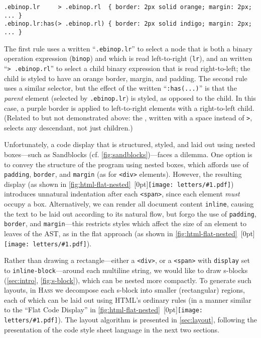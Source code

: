 \documentclass[acmsmall, screen]{acmart}
\newcommand{\hass}
{\textsc{Hass}}
\newcommand{\htmlTag}[1]
  {\texttt{<#1>}}
\newcommand{\cssAttr}[1]
{\texttt{#1}}
\newcommand{\cssClass}[1]
  {\texttt{#1}}
\newcommand{\figBubble}[1]{\raisebox{-0.03in}[0pt]{\texttt{[image: letters/\#1.pdf]}}}
\newcommand{\refBubble}[1]
  {~\figBubble{#1}}
\begin{document}
{\small

\begin{Verbatim}[xleftmargin=\parindent]
.ebinop.lr     > .ebinop.rl  { border: 2px solid orange; margin: 2px; ... }
.ebinop.lr:has(> .ebinop.rl) { border: 2px solid indigo; margin: 2px; ... }
\end{Verbatim}

}

\noindent
The first rule uses a  written ``\cssClass{.ebinop.lr}'' to select a node that is both a binary operation expression (\cssClass{binop}) and which is read left-to-right (\cssClass{lr}), and an  written ``\texttt{> }\cssClass{.ebinop.rl}'' to select a child binary expression that is read right-to-left; the child is styled to have an orange border, margin, and padding.
The second rule uses a similar selector, but the effect of the  written ``\texttt{:has(...)}'' is that the \textit{parent} element (selected by \cssClass{.ebinop.lr}) is styled, as opposed to the child.
In this case, a purple border is applied to left-to-right elements with a right-to-left child.
(Related to but not demonstrated above: the , written with a space instead of \texttt{>}, selects any descendant, not just children.)

Unfortunately, a code display that is structured, styled, and laid out using nested boxes---such as Sandblocks (cf. \autoref{fig:sandblocks})---faces a dilemma.
One option is to convey the structure of the program using nested boxes, which affords use of \cssAttr{padding}, \cssAttr{border}, and \cssAttr{margin} (as for \htmlTag{div} elements).
However, the resulting display (as shown in \autoref{fig:html-flat-nested}\refBubble{b}) introduces unnatural indentation after each \htmlTag{span}, since each element \emph{must} occupy a box.
Alternatively, we can render all document content \cssAttr{inline}, causing the text to be laid out according to its natural flow, but forgo the use of \cssAttr{padding}, \cssAttr{border}, and \cssAttr{margin}---this restricts styles which affect the size of an element to leaves of the AST, as in the flat approach (as shown in \autoref{fig:html-flat-nested}\refBubble{a}).


Rather than drawing a rectangle---either a \htmlTag{div}, or a \htmlTag{span} with \cssAttr{display} set to \cssAttr{inline-block}---around each multiline string, we would like to draw s-blocks (\autoref{sec:intro}, \autoref{fig:s-block}), which can be nested more compactly.
To generate such layouts, in \hass{} we decompose each s-block into smaller (rectangular) regions, each of which can be laid out using HTML's ordinary rules (in a manner similar to the ``Flat Code Display'' in \autoref{fig:html-flat-nested}\refBubble{a}).
The layout algorithm is presented in \autoref{sec:layout}, following the presentation of the code style sheet language in the next two sections.
\end{document}
